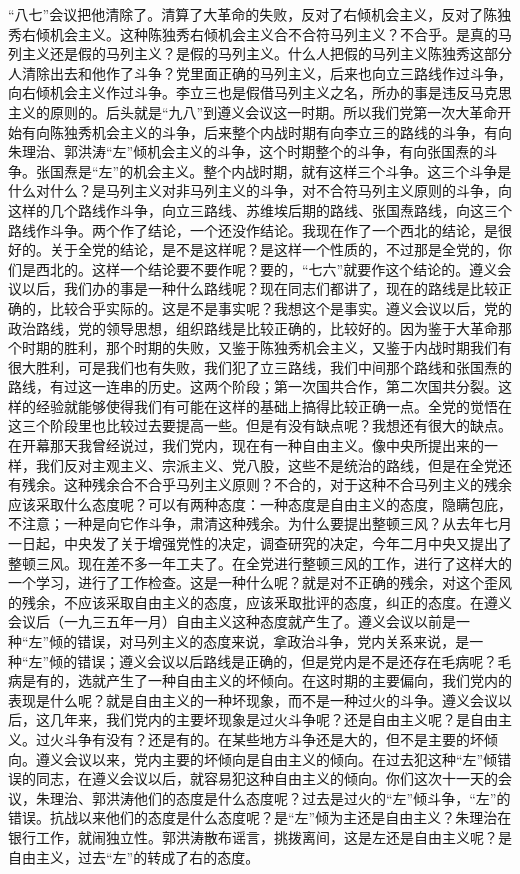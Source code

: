 “八七”会议把他清除了。清算了大革命的失败，反对了右倾机会主义，反对了陈独秀右倾机会主义。这种陈独秀右倾机会主义合不合符马列主义？不合乎。是真的马列主义还是假的马列主义？是假的马列主义。什么人把假的马列主义陈独秀这部分人清除出去和他作了斗争？党里面正确的马列主义，后来也向立三路线作过斗争，向右倾机会主义作过斗争。李立三也是假借马列主义之名，所办的事是违反马克思主义的原则的。后头就是“九八”到遵义会议这一时期。所以我们党第一次大革命开始有向陈独秀机会主义的斗争，后来整个内战时期有向李立三的路线的斗争，有向朱理治、郭洪涛“左”倾机会主义的斗争，这个时期整个的斗争，有向张国焘的斗争。张国焘是“左”的机会主义。整个内战时期，就有这样三个斗争。这三个斗争是什么对什么？是马列主义对非马列主义的斗争，对不合符马列主义原则的斗争，向这样的几个路线作斗争，向立三路线、苏维埃后期的路线、张国焘路线，向这三个路线作斗争。两个作了结论，一个还没作结论。我现在作了一个西北的结论，是很好的。关于全党的结论，是不是这样呢？是这样一个性质的，不过那是全党的，你们是西北的。这样一个结论要不要作呢？要的，“七六”就要作这个结论的。遵义会议以后，我们办的事是一种什么路线呢？现在同志们都讲了，现在的路线是比较正确的，比较合乎实际的。这是不是事实呢？我想这个是事实。遵义会议以后，党的政治路线，党的领导思想，组织路线是比较正确的，比较好的。因为鉴于大革命那个时期的胜利，那个时期的失败，又鉴于陈独秀机会主义，又鉴于内战时期我们有很大胜利，可是我们也有失败，我们犯了立三路线，我们中间那个路线和张国焘的路线，有过这一连串的历史。这两个阶段；第一次国共合作，第二次国共分裂。这样的经验就能够使得我们有可能在这样的基础上搞得比较正确一点。全党的觉悟在这三个阶段里也比较过去要提高一些。但是有没有缺点呢？我想还有很大的缺点。在开幕那天我曾经说过，我们党内，现在有一种自由主义。像中央所提出来的一样，我们反对主观主义、宗派主义、党八股，这些不是统治的路线，但是在全党还有残余。这种残余合不合乎马列主义原则？不合的，对于这种不合马列主义的残余应该采取什么态度呢？可以有两种态度：一种态度是自由主义的态度，隐瞒包庇，不注意；一种是向它作斗争，肃清这种残余。为什么要提出整顿三风？从去年七月一日起，中央发了关于增强党性的决定，调查研究的决定，今年二月中央又提出了整顿三风。现在差不多一年工夫了。在全党进行整顿三风的工作，进行了这样大的一个学习，进行了工作检查。这是一种什么呢？就是对不正确的残余，对这个歪风的残余，不应该采取自由主义的态度，应该釆取批评的态度，纠正的态度。在遵义会议后（一九三五年一月）自由主义这种态度就产生了。遵义会议以前是一种“左”倾的错误，对马列主义的态度来说，拿政治斗争，党内关系来说，是一种“左”倾的错误；遵义会议以后路线是正确的，但是党内是不是还存在毛病呢？毛病是有的，选就产生了一种自由主义的坏倾向。在这时期的主要偏向，我们党内的表现是什么呢？就是自由主义的一种坏现象，而不是一种过火的斗争。遵义会议以后，这几年来，我们党内的主要坏现象是过火斗争呢？还是自由主义呢？是自由主义。过火斗争有没有？还是有的。在某些地方斗争还是大的，但不是主要的坏倾向。遵义会议以来，党内主要的坏倾向是自由主义的倾向。在过去犯这种“左”倾错误的同志，在遵义会议以后，就容易犯这种自由主义的倾向。你们这次十一天的会议，朱理治、郭洪涛他们的态度是什么态度呢？过去是过火的“左”倾斗争，“左”的错误。抗战以来他们的态度是什么态度呢？是“左”倾为主还是自由主义？朱理治在银行工作，就闹独立性。郭洪涛散布谣言，挑拨离间，这是左还是自由主义呢？是自由主义，过去“左”的转成了右的态度。

